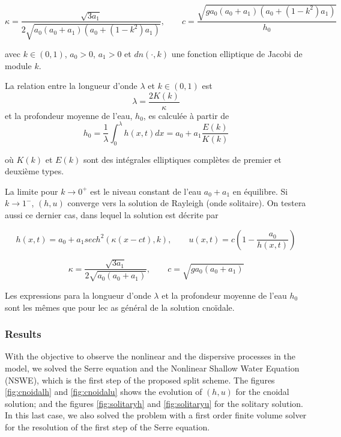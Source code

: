 \begin{equation*}
    \kappa = \frac{\sqrt{3a_1}}{2\sqrt{a_0(a_0+a_1)(a_0+(1-k^2)a_1)}}, \qquad
    c = \frac{\sqrt{g a_0(a_0+a_1)(a_0+(1-k^2)a_1)}}{h_0}
\end{equation*}

\noindent avec $k\in(0,1)$, $a_0>0$, $a_1>0$ et $dn(\cdot,k)$ une fonction elliptique de Jacobi de module $k$.

\indent La relation entre la longueur d'onde $\lambda$ et $k\in(0,1)$ est $$\lambda = \frac{2K(k)}{\kappa}$$ et la profondeur moyenne de l'eau, $h_0$, es calculée à partir de $$h_0 = \frac{1}{\lambda}\int_{0}^\lambda h(x,t)dx = a_0 + a_1 \frac{E(k)}{K(k)}$$

\noindent où $K(k)$ et $E(k)$ sont des intégrales elliptiques complètes de premier et deuxième types. 

\indent La limite pour $k\to0^+$ est le niveau constant de l'eau $a_0+a_1$ en équilibre. Si $k\to1^-$, $(h,u)$ converge vers la solution de Rayleigh (onde solitaire). On testera aussi ce dernier cas, dans lequel la solution est décrite par

\begin{equation*}
    h(x,t) = a_0 + a_1 sech^2(\kappa(x-ct),k), \qquad
    u(x,t) = c\left( 1 - \frac{a_0}{h(x,t)}\right)
\end{equation*}

\begin{equation*}
    \kappa = \frac{\sqrt{3a_1}}{2\sqrt{a_0(a_0+a_1)}}, \qquad
    c = \sqrt{g a_0(a_0+a_1)}
\end{equation*}

\indent Les expressions para la longueur d'onde $\lambda$ et la profondeur moyenne de l'eau $h_0$ sont les mêmes que pour lec as général de la solution cnoïdale.

\subsubsection{Results}

\indent With the objective to observe the nonlinear and the dispersive processes in the model, we solved the Serre equation and the Nonlinear Shallow Water Equation (NSWE), which is the first step of the proposed split scheme. The figures \ref{fig:cnoidalh} and \ref{fig:cnoidalu} shows the evolution of $(h,u)$ for the cnoidal solution; and the figures \ref{fig:solitaryh} and \ref{fig:solitaryu} for the solitary solution. In this last case, we also solved the problem with a first order finite volume solver for the resolution of the first step of the Serre equation.

